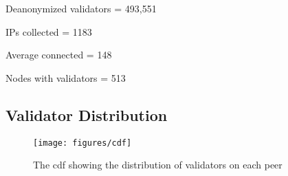 Deanonymized validators = 493,551

IPs collected = 1183

Average connected = 148

Nodes with validators = 513

\subsection{Validator Distribution}\label{subsec:validator-distribution}
\begin{figure*}[!ht]
    \texttt{[image: figures/cdf]}
    \caption{The cdf showing the distribution of validators on each peer}
    \label{fig:validatorsonpeers}
\end{figure*}